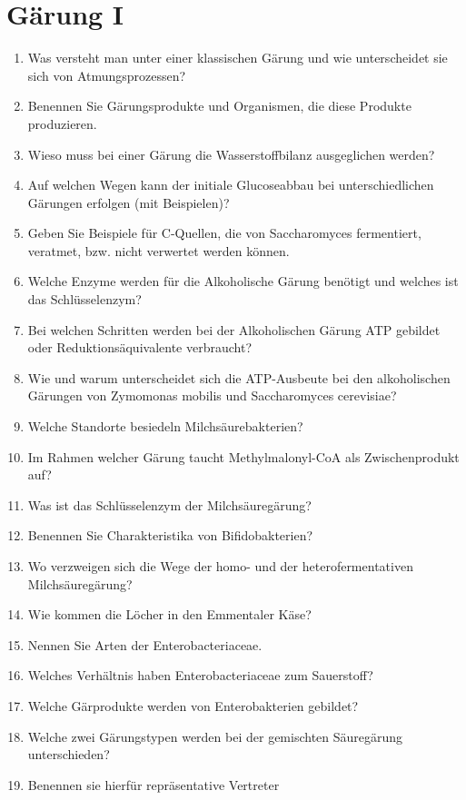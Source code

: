 
\section{Gärung I}
\begin{enumerate}
	\item Was versteht man unter einer klassischen Gärung und wie unterscheidet sie sich von Atmungsprozessen?
	\item Benennen Sie Gärungsprodukte und Organismen, die diese Produkte produzieren.
	\item Wieso muss bei einer Gärung die Wasserstoffbilanz ausgeglichen werden?
	\item Auf welchen Wegen kann der initiale Glucoseabbau bei unterschiedlichen Gärungen erfolgen (mit Beispielen)?
	\item Geben Sie Beispiele für C-Quellen, die von Saccharomyces fermentiert, veratmet, bzw. nicht verwertet werden können.
	\item Welche Enzyme werden für die Alkoholische Gärung benötigt und welches ist das Schlüsselenzym?
	\item Bei welchen Schritten werden bei der Alkoholischen Gärung ATP gebildet oder Reduktionsäquivalente verbraucht?
	\item Wie und warum unterscheidet sich die ATP-Ausbeute bei den alkoholischen Gärungen von Zymomonas mobilis und Saccharomyces cerevisiae?
	\item Welche Standorte besiedeln Milchsäurebakterien?
	\item Im Rahmen welcher Gärung taucht Methylmalonyl-CoA als Zwischenprodukt auf?
	\item Was ist das Schlüsselenzym der Milchsäuregärung?
	\item Benennen Sie Charakteristika von Bifidobakterien?
	\item Wo verzweigen sich die Wege der homo- und der heterofermentativen Milchsäuregärung?
	\item Wie kommen die Löcher in den Emmentaler Käse?
	\item Nennen Sie Arten der Enterobacteriaceae.
	\item Welches Verhältnis haben Enterobacteriaceae zum Sauerstoff?
	\item Welche Gärprodukte werden von Enterobakterien gebildet?
	\item Welche zwei Gärungstypen werden bei der gemischten Säuregärung unterschieden?
	\item Benennen sie hierfür repräsentative Vertreter

\end{enumerate}
